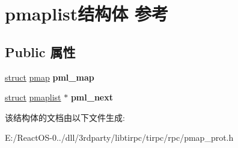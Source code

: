 \hypertarget{structpmaplist}{}\section{pmaplist结构体 参考}
\label{structpmaplist}
\subsection*{Public 属性}
\begin{DoxyCompactItemize}
\item 
\mbox{\label{structpmaplist_adb336032afc31e855fd82616d6f75de4}} 
\hyperlink{interfacestruct}{struct} \hyperlink{structpmap}{pmap} {\bfseries pml\+\_\+map}
\item 
\mbox{\label{structpmaplist_a9fbc04aad3af5e1435bf27a9a99aabc0}} 
\hyperlink{interfacestruct}{struct} \hyperlink{structpmaplist}{pmaplist} $\ast$ {\bfseries pml\+\_\+next}
\end{DoxyCompactItemize}


该结构体的文档由以下文件生成\+:\begin{DoxyCompactItemize}
\item 
E\+:/\+React\+O\+S-\/0../dll/3rdparty/libtirpc/tirpc/rpc/pmap\+\_\+prot.\+h\end{DoxyCompactItemize}
